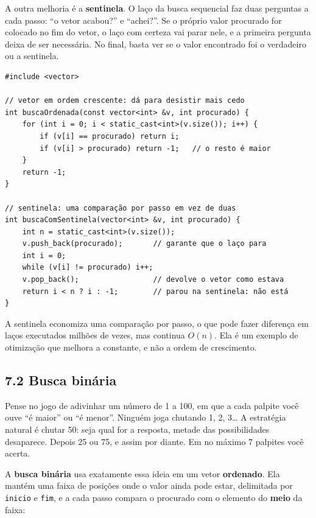 A outra melhoria é a \textbf{sentinela}. O laço da busca sequencial faz duas perguntas a cada passo: ``o vetor acabou?'' e ``achei?''. Se o próprio valor procurado for colocado no fim do vetor, o laço com certeza vai parar nele, e a primeira pergunta deixa de ser necessária. No final, basta ver se o valor encontrado foi o verdadeiro ou a sentinela.

\begin{codigo}
\begin{Verbatim}[breaklines=true, breaksymbolleft={}, fontsize=\footnotesize]
#include <vector>

// vetor em ordem crescente: dá para desistir mais cedo
int buscaOrdenada(const vector<int> &v, int procurado) {
    for (int i = 0; i < static_cast<int>(v.size()); i++) {
        if (v[i] == procurado) return i;
        if (v[i] > procurado) return -1;   // o resto é maior
    }
    return -1;
}

// sentinela: uma comparação por passo em vez de duas
int buscaComSentinela(vector<int> &v, int procurado) {
    int n = static_cast<int>(v.size());
    v.push_back(procurado);       // garante que o laço para
    int i = 0;
    while (v[i] != procurado) i++;
    v.pop_back();                 // devolve o vetor como estava
    return i < n ? i : -1;        // parou na sentinela: não está
}
\end{Verbatim}
\end{codigo}

A sentinela economiza uma comparação por passo, o que pode fazer diferença em laços executados milhões de vezes, mas continua $O(n)$. Ela é um exemplo de otimização que melhora a constante, e não a ordem de crescimento.

\subsection{7.2 Busca binária}

Pense no jogo de adivinhar um número de 1 a 100, em que a cada palpite você ouve ``é maior'' ou ``é menor''. Ninguém joga chutando 1, 2, 3\ldots{} A estratégia natural é chutar 50: seja qual for a resposta, metade das possibilidades desaparece. Depois 25 ou 75, e assim por diante. Em no máximo 7 palpites você acerta.

A \textbf{busca binária} usa exatamente essa ideia em um vetor \textbf{ordenado}. Ela mantém uma faixa de posições onde o valor ainda pode estar, delimitada por \texttt{inicio} e \texttt{fim}, e a cada passo compara o procurado com o elemento do \textbf{meio} da faixa:

